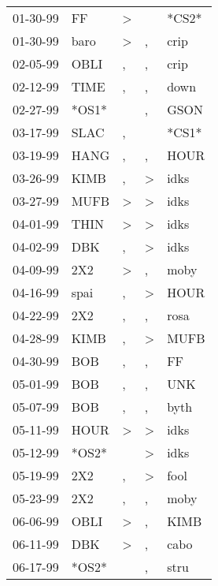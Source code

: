 \begin{supertabular}{lllll}
 01-30-99 &     FF &     \textgreater &               &  *CS2* \\
 01-30-99 &   baro &     \textgreater &             , &   crip \\
 02-05-99 &   OBLI &                , &             , &   crip \\
 02-12-99 &   TIME &                , &             , &   down \\
 02-27-99 &  *OS1* &                  &             , &   GSON \\
 03-17-99 &   SLAC &                , &               &  *CS1* \\
 03-19-99 &   HANG &                , &             , &   HOUR \\
 03-26-99 &   KIMB &                , &  \textgreater &   idks \\
 03-27-99 &   MUFB &     \textgreater &  \textgreater &   idks \\
 04-01-99 &   THIN &     \textgreater &  \textgreater &   idks \\
 04-02-99 &    DBK &                , &  \textgreater &   idks \\
 04-09-99 &    2X2 &     \textgreater &             , &   moby \\
 04-16-99 &   spai &                , &  \textgreater &   HOUR \\
 04-22-99 &    2X2 &                , &             , &   rosa \\
 04-28-99 &   KIMB &                , &  \textgreater &   MUFB \\
 04-30-99 &    BOB &                , &             , &     FF \\
 05-01-99 &    BOB &                , &             , &    UNK \\
 05-07-99 &    BOB &                , &             , &   byth \\
 05-11-99 &   HOUR &     \textgreater &  \textgreater &   idks \\
 05-12-99 &  *OS2* &                  &  \textgreater &   idks \\
 05-19-99 &    2X2 &                , &  \textgreater &   fool \\
 05-23-99 &    2X2 &                , &             , &   moby \\
 06-06-99 &   OBLI &     \textgreater &             , &   KIMB \\
 06-11-99 &    DBK &     \textgreater &             , &   cabo \\
 06-17-99 &  *OS2* &                  &             , &   stru \\

\end{supertabular}
